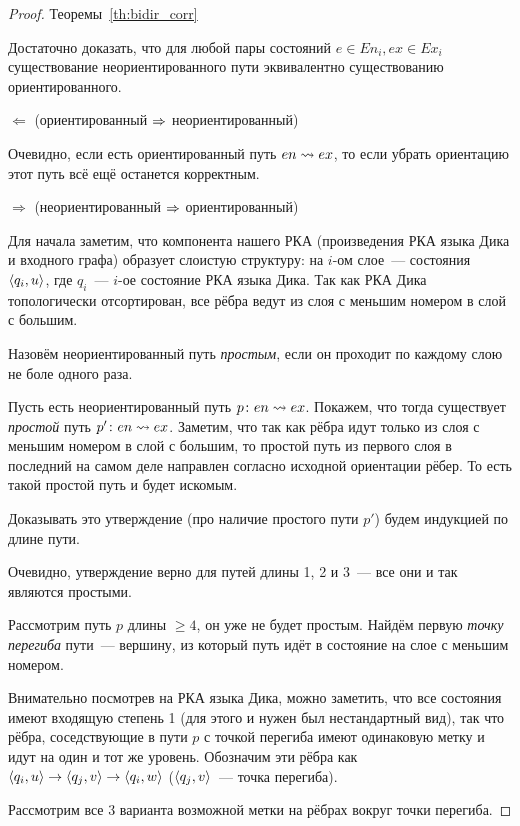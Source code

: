 \begin{proof}{Теоремы~\ref{th:bidir_corr}}

  Достаточно доказать, что для любой пары состояний $e \in En_i, ex \in Ex_i$ существование неориентированного пути эквивалентно существованию ориентированного.

  $\Leftarrow$ (ориентированный $\Rightarrow$ неориентированный)

  Очевидно, если есть ориентированный путь $en \rightsquigarrow ex$, то если убрать ориентацию этот путь всё ещё останется корректным.

  $\Rightarrow$ (неориентированный $\Rightarrow$ ориентированный)

  Для начала заметим, что компонента нашего РКА (произведения РКА языка Дика и входного графа) образует слоистую структуру: на $i$-ом слое~--- состояния $\langle q_i, u \rangle$, где $q_i$~--- $i$-ое состояние РКА языка Дика. Так как РКА Дика топологически отсортирован, все рёбра ведут из слоя с меньшим номером в слой с большим.

  Назовём неориентированный путь \textit{простым}, если он проходит по каждому слою не боле одного раза.

  Пусть есть неориентированный путь $p \colon en \rightsquigarrow ex$. Покажем, что тогда существует \textit{простой} путь $p' \colon en \rightsquigarrow ex$. Заметим, что так как рёбра идут только из слоя с меньшим номером в слой с большим, то простой путь из первого слоя в последний на самом деле направлен согласно исходной ориентации рёбер. То есть такой простой путь и будет искомым.

  Доказывать это утверждение (про наличие простого пути $p'$) будем индукцией по длине пути.

  Очевидно, утверждение верно для путей длины 1, 2 и 3~--- все они и так являются простыми.

  Рассмотрим путь $p$ длины $\ge 4$, он уже не будет простым. Найдём первую \textit{точку перегиба} пути~--- вершину, из который путь идёт в состояние на слое с меньшим номером.

  Внимательно посмотрев на РКА языка Дика, можно заметить, что все состояния имеют входящую степень 1 (для этого и нужен был нестандартный вид), так что рёбра, соседствующие в пути $p$ с точкой перегиба имеют одинаковую метку и идут на один и тот же уровень. Обозначим эти рёбра как $\langle q_i, u \rangle \rightarrow \langle q_j, v \rangle \rightarrow \langle q_i, w \rangle$ ($\langle q_j, v \rangle$~--- точка перегиба).

  Рассмотрим все 3 варианта возможной метки на рёбрах вокруг точки перегиба.


\end{proof}
